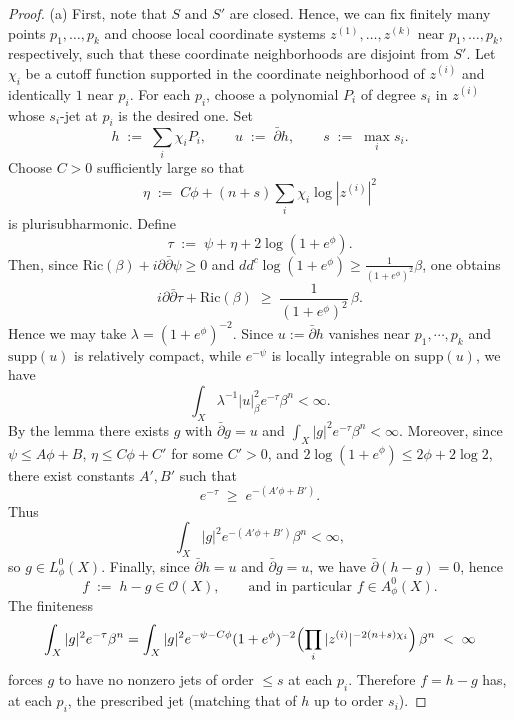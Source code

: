 \documentclass[a4paper, 12pt]{article}
\newcommand{\Ric}{\mathrm{Ric}}
\newcommand{\supp}{\mathrm{supp}}
\newcommand{\idd}{i\partial\bar\partial}
\begin{document}
\begin{proof}
\noindent (a)
First, note that $S$ and $S'$ are closed. Hence, we can fix finitely many points $p_1,\dots,p_k$ and choose local coordinate systems
$z^{(1)},\dots,z^{(k)}$ near $p_1,\dots,p_k$, respectively, such that these coordinate neighborhoods are disjoint
from $S'$.
Let $\chi_i$ be a cutoff function supported in the coordinate neighborhood of $z^{(i)}$ and identically $1$
near $p_i$.
For each $p_i$, choose a polynomial $P_i$ of degree $s_i$ in $z^{(i)}$ whose $s_i$-jet at $p_i$ is the desired one.
Set
\[
h \;:=\; \sum_i \chi_i P_i,\qquad u\;:=\;\bar\partial h,\qquad s\;:=\;\max_i s_i.
\]
Choose $C>0$ sufficiently large so that
\[
\eta \;:=\; C\phi + (n+s)\sum_i \chi_i \log|z^{(i)}|^2
\]
is plurisubharmonic. Define
\[
\tau \;:=\; \psi+\eta+2\log(1+e^\phi).
\]
Then, since $\Ric(\beta)+\idd\psi\ge 0$ and $dd^c\log(1+e^\phi)\ge\frac{1}{(1+e^\phi)^2}\beta$, one obtains
\[
\idd\tau+\Ric(\beta)\;\ge\;\frac{1}{(1+e^\phi)^2}\,\beta.
\]
Hence we may take $\lambda=(1+e^\phi)^{-2}$.
Since $u:=\bar \partial h$ vanishes near $p_1,\cdots,p_k$ and $\supp(u)$ is relatively compact, while $e^{-\psi}$ is locally integrable on $\supp(u)$, we have
\[
\int_X \lambda^{-1}|u|_\beta^2 e^{-\tau}\beta^n <\infty.
\]
By the lemma there exists $g$ with $\bar\partial g=u$ and $\int_X |g|^2 e^{-\tau}\beta^n<\infty$.
Moreover, since $\psi\le A\phi+B$, $\eta\le C\phi+C'$ for some $C'>0$, and
$2\log(1+e^\phi)\le 2\phi+2\log 2$, there exist constants $A',B'$ such that
\[
e^{-\tau}\;\ge\; e^{-(A'\phi+B')}.
\]
Thus
\[
\int_X |g|^2 e^{-(A'\phi+B')}\beta^n <\infty,
\]
so $g\in L_\phi^0(X)$.
Finally, since $\bar\partial h=u$ and $\bar\partial g=u$, we have $\bar\partial(h-g)=0$, hence
\[
f\;:=\;h-g \in \mathcal{O}(X),
\qquad\text{and in particular } f\in A_\phi^0(X).
\]
The finiteness
\[
\int_X |g|^2 e^{-\tau}\beta^n
=\int_X |g|^2 e^{-\psi-C\phi}(1+e^\phi)^{-2}
\Bigl(\prod_i |z^{(i)}|^{-2(n+s)\chi_i}\Bigr)\,\beta^n \;<\;\infty
\]
forces $g$ to have no nonzero jets of order $\le s$ at each $p_i$.
Therefore $f=h-g$ has, at each $p_i$, the prescribed jet (matching that of $h$ up to order $s_i$).


\end{proof}
\end{document}
